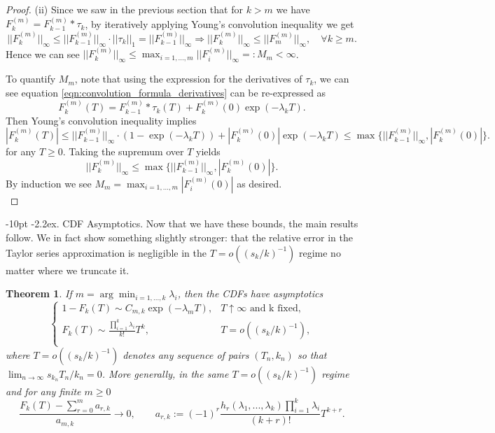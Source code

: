 \documentclass[10pt,oneside,reqno]{article}
\makeatletter
\theoremstyle{plain}
\newtheorem{theorem}{Theorem}[section]
\theoremstyle{definition}
\numberwithin{equation}{section}
\def\subsubsection#1{\@startsection{subsubsection}{3}{0pt}%
{\medskipamount}%
{-10pt}%
{\normalsize\itshape}{\kern-2.2ex. #1.}}
\renewcommand{\leq}{\leqslant}
\renewcommand{\geq}{\geqslant}
\makeatother
\begin{document}
\begin{proof}
\noindent (ii) Since we saw in the previous section that for $k > m$ we have $F_k^{(m)} = F_{k-1}^{(m)} \ast \tau_k$, by iteratively applying Young's convolution inequality we get
%
\[ ||F_{k}^{(m)}||_\infty \leq ||F_{k-1}^{(m)}||_\infty \cdot ||\tau_k||_1 = ||F_{k-1}^{(m)}||_\infty  \Longrightarrow  ||F_{k}^{(m)}||_\infty \leq ||F_m^{(m)}||_\infty, \quad \forall k \geq m.\]
%
\noindent Hence we can see $||F_k^{(m)}||_\infty \leq \max_{i=1,...,m} ||F_i^{(m)}||_\infty =: M_m < \infty$. 

To quantify $M_m$, note that using the expression for the derivatives of $\tau_k$, we can see equation \eqref{eqn:convolution_formula_derivatives} can be re-expressed as
%
\[F_k^{(m)}(T) = F_{k-1}^{(m)} \ast \tau_k(T) + F_{k}^{(m)}(0) \exp(-\lambda_k T).\]
%
\noindent Then Young's convolution inequality implies
%
\[|F_k^{(m)}(T)| \leq ||F_{k-1}^{(m)}||_\infty \cdot (1-\exp(-\lambda_k T)) + |F_{k}^{(m)}(0)| \exp(-\lambda_k T) \leq \max \{||F_{k-1}^{(m)}||_\infty, |F_{k}^{(m)}(0)|\}.\]
%
for any $T \geq 0$. Taking the supremum over $T$ yields
%
    \[||F_k^{(m)}||_\infty \leq \max \{||F_{k-1}^{(m)}||_\infty, |F_{k}^{(m)}(0)|\}.\]
%
\noindent By induction we see $M_m = \max_{i=1,..., m}|F_i^{(m)}(0)|$ as desired. \\
\end{proof}



\subsubsection{CDF Asymptotics}
\label{app:cdf-asymptotics}
\noindent Now that we have these bounds, the main results follow. We in fact show something slightly stronger: that the relative error in the Taylor series approximation is negligible in the $T = o((s_k/k)^{-1})$ regime no matter where we truncate it. 

\begin{theorem}
    If $m = \arg \min_{i=1,...,k} \lambda_i$, then the CDFs have asymptotics
        \[\begin{cases}
            1-F_k(T)  \sim   C_{m,k}\exp(-\lambda_m T), & T \uparrow \infty \text{ and k fixed,}\\
            F_k(T)  \sim \frac{\prod_{i=1}^k \lambda_i}{k!} T^{k}, &  T = o((s_{k}/k)^{-1}),\\
        \end{cases}\]
        \noindent where $T = o((s_k/k)^{-1})$ denotes any sequence of pairs $(T_n, k_n)$ so that $\lim_{n \to \infty} s_{k_n}T_n/k_n = 0$. More generally, in the same $T = o((s_k/k)^{-1})$ regime and for any finite $m \geq 0$
        \[\frac{F_k(T) - \sum_{r=0}^{m} a_{r,k}}{a_{m, k}} \to 0, \qquad a_{r,k} := (-1)^r \frac{h_{r}(\lambda_1,..., \lambda_k)\prod_{i=1}^k \lambda_i }{(k+r)!} T^{k+r}.\]
\end{theorem}
\end{document}
